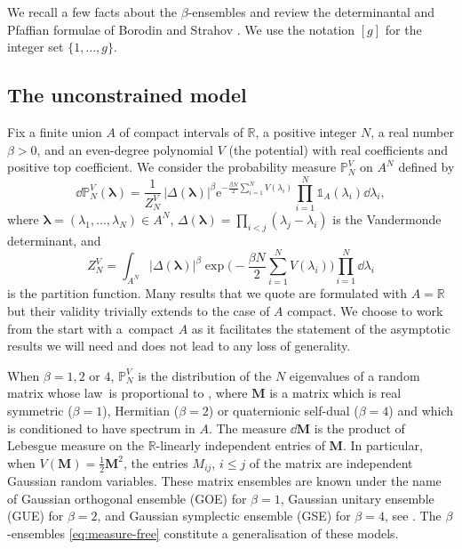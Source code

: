 \documentclass[pdftex]{sigma}
\numberwithin{equation}{section}
\newcommand{\ee}{\mathrm{e}}
\newcommand{\ind}{\mathds{1}}
\begin{document}
We recall a few facts about the $\beta$-ensembles and review the
determinantal and Pfaffian formulae of Borodin and Strahov \cite{borodin_averages}. We use the notation $[g]$ for the integer set $\{1,\ldots,g\}$.

\subsection{The unconstrained model}%

Fix a finite union $A$ of compact intervals of $\mathbb{R}$, a positive integer $N$, a real number
$\beta > 0$, and an even-degree polynomial $V$ (the potential) with real coefficients and positive top coefficient. We consider the probability measure
$\mathbb{P}_{N}^{V}$ on $A^{N}$ defined by
\begin{equation}\label{eq:measure-free}
 \dd \mathbb{P}_{N}^V(\bm{\lambda}) = \frac{1}{Z_{N}^V}\,|\Delta(\bm{\lambda})|^{\beta}\ee^{-\frac{\beta N}{2}\sum_{i = 1}^N V(\lambda_{i})}\prod_{i=1}^{N}\ind_{A}(\lambda_{i})\dd\lambda_{i},
\end{equation}
where
$\bm{\lambda} = (\lambda_{1}, \ldots, \lambda_{N}) \in A^{N}$,
$\Delta(\bm{\lambda}) = \prod_{i < j}(\lambda_{j} - \lambda_{i})$ is
the Vandermonde determinant, and
\begin{equation*}
 Z_{N}^V = \int_{A^{N}} |\Delta(\bm{\lambda})|^{\beta}\exp\Biggl(-\frac{\beta N}{2}\sum_{i = 1}^N V(\lambda_{i})\Biggr) \prod_{i=1}^{N}\dd\lambda_{i}
\end{equation*}
is the partition function. Many results that we quote are formulated with $A = \mathbb{R}$ but their validity trivially extends to the case of $A$ compact. We choose to work from the start with a~compact $A$ as it facilitates the statement of the asymptotic results we will need and does not lead to any loss of generality.

 When $\beta = 1, 2 \text{ or }4$,
 $\mathbb{P}_{N}^{V}$ is the distribution of the $N$ eigenvalues of
 a random matrix whose law~is proportional to ,
  where $\bm{M}$ is a matrix which is real symmetric ($\beta = 1$), Hermitian ($\beta = 2$) or
 quaternionic self-dual ($\beta = 4$) and which is conditioned to have spectrum in $A$. The measure $\dd \bm{M}$ is
 the product of Lebesgue measure on the $\mathbb{R}$-linearly independent entries of $\bm{M}$. In particular, when $V(\bm{M}) = \frac{1}{2}\bm{M}^2$, the entries $M_{ij}$, $i \leq j$
 of the matrix are independent Gaussian random variables. These matrix ensembles
are known under the name of Gaussian orthogonal ensemble
 (GOE) for $\beta = 1$, Gaussian unitary ensemble (GUE) for
 $\beta = 2$, and Gaussian symplectic ensemble (GSE) for $\beta = 4$,
 see \cite{Mehtabook}. The $\beta$-ensembles \eqref{eq:measure-free} constitute a
 generalisation of these models.
\end{document}
